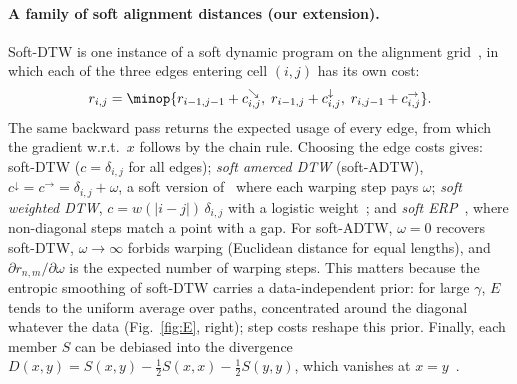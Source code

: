 \paragraph{A family of soft alignment distances (our extension).}
Soft-DTW is one instance of a soft dynamic program on the alignment grid~\cite{mensch2018differentiable}, in which each of the three edges entering cell $(i,j)$ has its own cost:
\begin{equation}
r_{i,j}=\minop\{r_{i-1,j-1}+c^{\searrow}_{i,j},\; r_{i-1,j}+c^{\downarrow}_{i,j},\; r_{i,j-1}+c^{\rightarrow}_{i,j}\}.
\end{equation}
The same backward pass returns the expected usage of every edge, from which the gradient w.r.t.\ $x$ follows by the chain rule. Choosing the edge costs gives: soft-DTW ($c=\delta_{i,j}$ for all edges); \emph{soft amerced DTW} (soft-ADTW), $c^{\downarrow}=c^{\rightarrow}=\delta_{i,j}+\omega$, a soft version of~\cite{herrmann2023amercing} where each warping step pays $\omega$; \emph{soft weighted DTW}, $c=w(|i-j|)\,\delta_{i,j}$ with a logistic weight~\cite{jeong2011weighted}; and \emph{soft ERP}~\cite{chen2004marriage}, where non-diagonal steps match a point with a gap. For soft-ADTW, $\omega=0$ recovers soft-DTW, $\omega\to\infty$ forbids warping (Euclidean distance for equal lengths), and $\partial r_{n,m}/\partial\omega$ is the expected number of warping steps. This matters because the entropic smoothing of soft-DTW carries a data-independent prior: for large $\gamma$, $E$ tends to the uniform average over paths, concentrated around the diagonal whatever the data (Fig.~\ref{fig:E}, right); step costs reshape this prior. Finally, each member $S$ can be debiased into the divergence $D(x,y)=S(x,y)-\tfrac12S(x,x)-\tfrac12S(y,y)$, which vanishes at $x=y$~\cite{blondel2021differentiable}.
